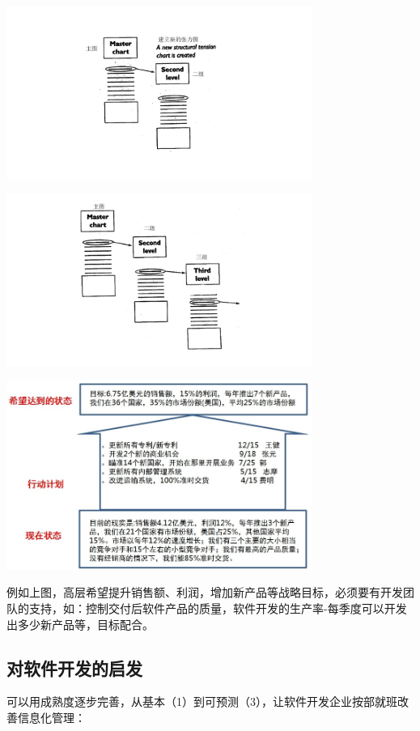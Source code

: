 \includegraphics[width=10cm]{Fritz_diagrams_4.jpg}


\includegraphics[width=10cm]{Fritz_diag5.jpg}


\includegraphics[width=10cm]{Drucker_4_tu3.jpg}

例如上图，高层希望提升销售额、利润，增加新产品等战略目标，必须要有开发团队的支持，如：控制交付后软件产品的质量，软件开发的生产率-每季度可以开发出多少新产品等，目标配合。

\hypertarget{ux5bf9ux8f6fux4ef6ux5f00ux53d1ux7684ux542fux53d1}{%
\subsection{对软件开发的启发}\label{ux5bf9ux8f6fux4ef6ux5f00ux53d1ux7684ux542fux53d1}}

可以用成熟度逐步完善，从基本（1）到可预测（3），让软件开发企业按部就班改善信息化管理：

